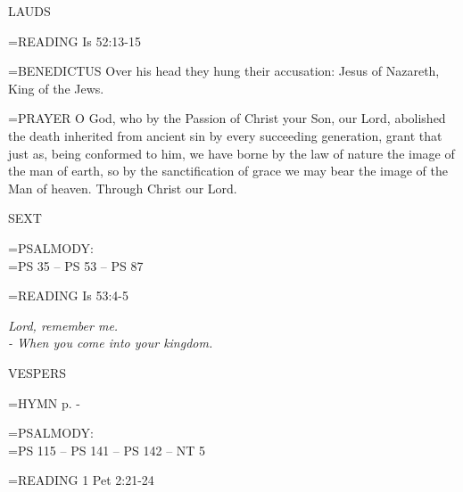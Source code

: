 \begin{flushleft}\normalsize LAUDS\\\end{flushleft}

\hangindent=\parindent \small{\uppercase{READING}}    Is 52:13-15 \textbf{   \\}

\hangindent=\parindent \small{BENEDICTUS 	Over his head they hung their accusation: Jesus of Nazareth, King of the Jews.\\}

\hangindent=\parindent \small{PRAYER 	O God, who by the Passion of Christ your Son, our Lord, abolished the death inherited from ancient sin by every succeeding generation, grant that just as, being conformed to him, we have borne by the law of nature the image of the man of earth, so by the sanctification of grace we may bear the image of the Man of heaven. Through Christ our Lord.}

\begin{flushleft}\normalsize SEXT\\\end{flushleft}

\hangindent=\parindent \small{PSALMODY:}\\
\hangindent=\parindent  PS 35 -- PS 53 -- PS 87\vspace{0.5em}

\hangindent=\parindent \small{\uppercase{READING}}    Is 53:4-5 \textbf{   \\}

\begin{center}
\textit{Lord, remember me.\\
- When you come into your kingdom.}
\end{center}

\begin{flushleft}\normalsize VESPERS\\\end{flushleft}

\hangindent=\parindent \small{\uppercase{HYMN} p. \pageref{lent:firstHymn}-\pageref{lent:lastHymn}\\}

\hangindent=\parindent \small{PSALMODY:}\\
\hangindent=\parindent  PS 115 -- PS 141 -- PS 142 -- NT 5\vspace{0.5em}

\hangindent=\parindent \small{\uppercase{READING}}    1 Pet 2:21-24 \textbf{   \\}

